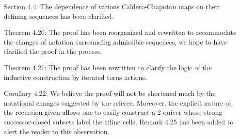 \documentclass[11pt,a4paper]{{scrartcl}}
\begin{document}
\begin{enumerate}
  \item[Section 4.4:] The dependence of various Caldero-Chapoton maps on their defining sequences has been clarified.
  \item[Theorem 4.20:] The proof has been reorganized and rewritten to accommodate the changes of notation surrounding admissible sequences, we hope to have clarified the proof in the process.
  \item[Theorem 4.21:] The proof has been rewritten to clarify the logic of the inductive construction by iterated torus actions.
  \item[Corollary 4.22:] We believe the proof will not be shortened much by the notational changes suggested by the referee.
    Moreover, the explicit nature of the recursion given allows one to easily construct a 2-quiver whose strong successor-closed subsets label the affine cells, Remark 4.25 has been added to alert the reader to this observation. 
\end{enumerate}
\end{document}
